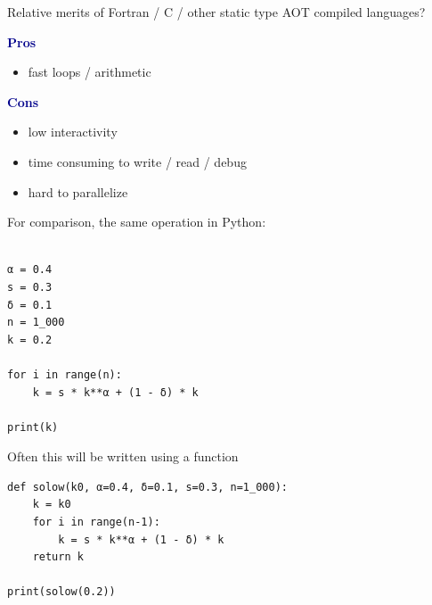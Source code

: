\documentclass[
    xcolor={svgnames,dvipsnames},
    hyperref={colorlinks, citecolor=DeepPink4, linkcolor=DarkRed, urlcolor=DarkBlue}
    ]{beamer}  %
\newcommand{\navy}[1]{\textcolor{DarkBlue}{\bf #1}}
\newcommand{\1}{\mathbbm 1}
\begin{document}
\begin{frame}

    Relative merits of Fortran / C / other static type AOT compiled languages?

    \vspace{0.5em}
    \vspace{0.5em}
    \navy{Pros}

    \begin{itemize}
        \item fast loops / arithmetic
    \end{itemize}


    \vspace{0.5em}

    \navy{Cons}

    \begin{itemize}
        \item low interactivity
        \item time consuming to write / read / debug
        \item hard to parallelize
    \end{itemize}

\end{frame}




\begin{frame}[fragile]

    For comparison, the same operation in Python:
    
    \begin{verbatim}

α = 0.4
s = 0.3
δ = 0.1
n = 1_000
k = 0.2

for i in range(n):
    k = s * k**α + (1 - δ) * k

print(k)

    \end{verbatim}

\end{frame}


\begin{frame}[fragile]

    Often this will be written using a function
    
    \begin{verbatim}
def solow(k0, α=0.4, δ=0.1, s=0.3, n=1_000):
    k = k0
    for i in range(n-1):
        k = s * k**α + (1 - δ) * k
    return k

print(solow(0.2))
    \end{verbatim}

\end{frame}
\end{document}

